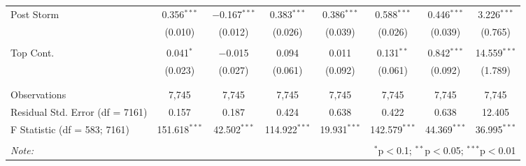 \begin{table}[!htbp]
\begin{tabular}{@{\extracolsep{5pt}}lccccccc}
 Post Storm & 0.356$^{***}$ & $-$0.167$^{***}$ & 0.383$^{***}$ & 0.386$^{***}$ & 0.588$^{***}$ & 0.446$^{***}$ & 3.226$^{***}$ \\ 
  & (0.010) & (0.012) & (0.026) & (0.039) & (0.026) & (0.039) & (0.765) \\ 
  & & & & & & & \\ 
 Top Cont. & 0.041$^{*}$ & $-$0.015 & 0.094 & 0.011 & 0.131$^{**}$ & 0.842$^{***}$ & 14.559$^{***}$ \\ 
  & (0.023) & (0.027) & (0.061) & (0.092) & (0.061) & (0.092) & (1.789) \\ 
  & & & & & & & \\ 
\hline \\[-1.8ex] 
Observations & 7,745 & 7,745 & 7,745 & 7,745 & 7,745 & 7,745 & 7,745 \\ 
Residual Std. Error (df = 7161) & 0.157 & 0.187 & 0.424 & 0.638 & 0.422 & 0.638 & 12.405 \\ 
F Statistic (df = 583; 7161) & 151.618$^{***}$ & 42.502$^{***}$ & 114.922$^{***}$ & 19.931$^{***}$ & 142.579$^{***}$ & 44.369$^{***}$ & 36.995$^{***}$ \\ 
\hline 
\hline \\[-1.8ex] 
\textit{Note:}  & \multicolumn{7}{r}{$^{*}$p$<$0.1; $^{**}$p$<$0.05; $^{***}$p$<$0.01} \\ 
\end{tabular} 
\end{table} 
